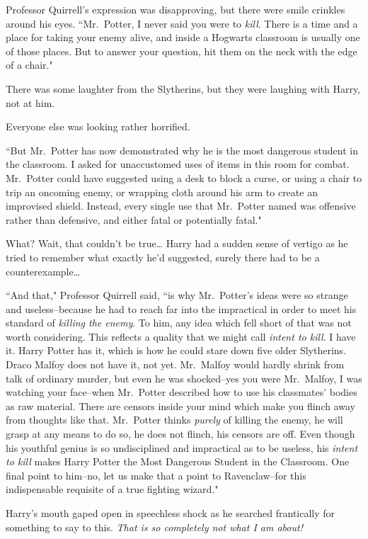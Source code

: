 Professor Quirrell's expression was disapproving, but there were smile crinkles around his eyes. ``Mr.~Potter, I never said you were to \emph{kill}. There is a time and a place for taking your enemy alive, and inside a Hogwarts classroom is usually one of those places. But to answer your question, hit them on the neck with the edge of a chair."

There was some laughter from the Slytherins, but they were laughing with Harry, not at him.

Everyone else was looking rather horrified.

``But Mr.~Potter has now demonstrated why he is the most dangerous student in the classroom. I asked for unaccustomed uses of items in this room for combat. Mr.~Potter could have suggested using a desk to block a curse, or using a chair to trip an oncoming enemy, or wrapping cloth around his arm to create an improvised shield. Instead, every single use that Mr.~Potter named was offensive rather than defensive, and either fatal or potentially fatal."

What? Wait, that couldn't be true{\ldots} Harry had a sudden sense of vertigo as he tried to remember what exactly he'd suggested, surely there had to be a counterexample{\ldots}

``And that," Professor Quirrell said, ``is why Mr.~Potter's ideas were so strange and useless\---because he had to reach far into the impractical in order to meet his standard of \emph{killing the enemy}. To him, any idea which fell short of that was not worth considering. This reflects a quality that we might call \emph{intent to kill}. I have it. Harry Potter has it, which is how he could stare down five older Slytherins. Draco Malfoy does not have it, not yet. Mr.~Malfoy would hardly shrink from talk of ordinary murder, but even he was shocked\---yes you were Mr.~Malfoy, I was watching your face\---when Mr.~Potter described how to use his classmates' bodies as raw material. There are censors inside your mind which make you flinch away from thoughts like that. Mr.~Potter thinks \emph{purely} of killing the enemy, he will grasp at any means to do so, he does not flinch, his censors are off. Even though his youthful genius is so undisciplined and impractical as to be useless, his \emph{intent to kill} makes Harry Potter the Most Dangerous Student in the Classroom. One final point to him\---no, let us make that a point to Ravenclaw\---for this indispensable requisite of a true fighting wizard."

Harry's mouth gaped open in speechless shock as he searched frantically for something to say to this. \emph{That is so completely not what I am about!}

